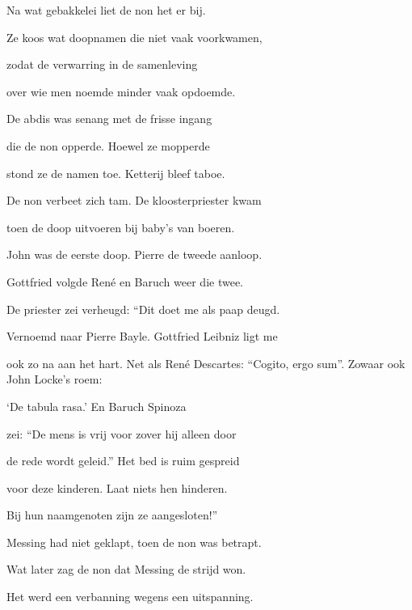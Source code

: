 Na wat gebakkelei
liet de non het er bij.

Ze koos wat doopnamen
die niet vaak voorkwamen,

zodat de verwarring
in de samenleving

over wie men noemde
minder vaak opdoemde.

De abdis was senang
met de frisse ingang

die de non opperde.
Hoewel ze mopperde

stond ze de namen toe.
Ketterij bleef taboe.

De non verbeet zich tam.
De kloosterpriester kwam

toen de doop uitvoeren
bij baby's van boeren.

John was de eerste doop.
Pierre de tweede aanloop.

Gottfried volgde René
en Baruch weer die twee.

De priester zei verheugd:
“Dit doet me als paap deugd.

Vernoemd naar Pierre Bayle.
Gottfried Leibniz ligt me

ook zo na aan het hart.
Net als René Descartes:
“Cogito, ergo sum”.
Zowaar ook John Locke’s roem:

‘De tabula rasa.’
En Baruch Spinoza

zei: “De mens is vrij voor
zover hij alleen door

de rede wordt geleid.”
Het bed is ruim gespreid

voor deze kinderen.
Laat niets hen hinderen.

Bij hun naamgenoten
zijn ze aangesloten!”

Messing had niet geklapt,
toen de non was betrapt.

Wat later zag de non
dat Messing de strijd won.

Het werd een verbanning
wegens een uitspanning.
